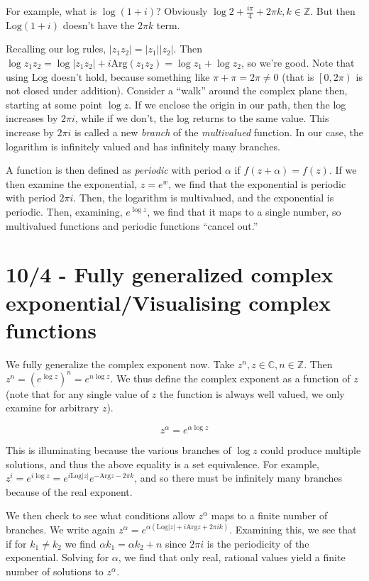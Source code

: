 \documentclass[10pt]{report}
\newcommand{\abs}[1]{\left|#1\right|}
\newcommand{\Log}[0]{\mathrm{Log} }
\newcommand{\Arg}[0]{\mathrm{Arg} }
\begin{document}
For example, what is $\log(1+i)$? Obviously $\log 2 + \frac{i\pi}{4}+2\pi k, k \in \mathbb{Z}$. But then $\Log (1+i)$ doesn't have the $2\pi k$ term.

Recalling our log rules, $\abs{z_1 z_2} = \abs{z_1}\abs{z_2}$. Then $\log z_1z_2 = \log \abs{z_1z_2} + i\Arg(z_1z_2) = \log z_1 + \log z_2$, so we're good. Note that using Log doesn't hold, because something like $\pi + \pi = 2\pi \neq 0$ (that is $\left[0,2\pi\right)$ is not closed under addition). Consider a ``walk'' around the complex plane then, starting at some point $\log z$. If we enclose the origin in our path, then the log increases by $2\pi i$, while if we don't, the log returns to the same value. This increase by $2\pi i$ is called a new \emph{branch} of the \emph{multivalued} function. In our case, the logarithm is infinitely valued and has infinitely many branches. 

A function is then defined as \emph{periodic} with period $\alpha$ if $f(z+\alpha) = f(z)$. If we then examine the exponential, $z=e^w$, we find that the exponential is periodic with period $2\pi i$. Then, the logarithm is multivalued, and the exponential is periodic. Then, examining, $e^{\log z}$, we find that it maps to a single number, so multivalued functions and periodic functions ``cancel out.''

\chapter{10/4 - Fully generalized complex exponential/Visualising complex functions}

We fully generalize the complex exponent now. Take $z^n, z\in\mathbb{C},n\in\mathbb{Z}$. Then $z^n=\left( e^{\log z} \right)^n = e^{n\log z}$. We thus define the complex exponent as a function of $z$ (note that for any single value of $z$ the function is always well valued, we only examine for arbitrary $z$). 

$$z^\alpha=e^{\alpha \log z}$$

This is illuminating because the various branches of $\log z$ could produce multiple solutions, and thus the above equality is a set equivalence. For example, $z^i = e^{i\log z} = e^{i\Log \abs{z}}e^{-\Arg z - 2\pi k}$, and so there must be infinitely many branches because of the real exponent.

We then check to see what conditions allow $z^\alpha$ maps to a finite number of branches. We write again $z^\alpha=e^{\alpha\left( \Log\abs{z}+i\Arg z + 2\pi i k \right)}$. Examining this, we see that if for $k_1 \neq k_2$ we find $\alpha k_1 = \alpha k_2+ n$ since $2\pi i$ is the periodicity of the exponential. Solving for $\alpha$, we find that only real, rational values yield a finite number of solutions to $z^\alpha$. 
\end{document}
